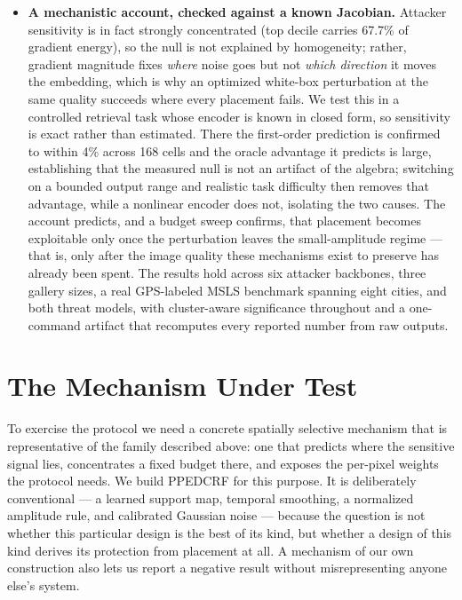 \documentclass[10pt,journal]{IEEEtran}
\begin{document}
\begin{itemize}
	\item \textbf{A mechanistic account, checked against a known Jacobian.} Attacker sensitivity is in fact strongly concentrated (top decile carries 67.7\% of gradient energy), so the null is not explained by homogeneity; rather, gradient magnitude fixes \emph{where} noise goes but not \emph{which direction} it moves the embedding, which is why an optimized white-box perturbation at the same quality succeeds where every placement fails. We test this in a controlled retrieval task whose encoder is known in closed form, so sensitivity is exact rather than estimated. There the first-order prediction is confirmed to within 4\% across 168 cells and the oracle advantage it predicts is large, establishing that the measured null is not an artifact of the algebra; switching on a bounded output range and realistic task difficulty then removes that advantage, while a nonlinear encoder does not, isolating the two causes. The account predicts, and a budget sweep confirms, that placement becomes exploitable only once the perturbation leaves the small-amplitude regime --- that is, only after the image quality these mechanisms exist to preserve has already been spent. The results hold across six attacker backbones, three gallery sizes, a real GPS-labeled MSLS benchmark spanning eight cities, and both threat models, with cluster-aware significance throughout and a one-command artifact that recomputes every reported number from raw outputs.
\end{itemize}

\section{The Mechanism Under Test}
\label{sec:method}

To exercise the protocol we need a concrete spatially selective mechanism that
is representative of the family described above: one that predicts where the
sensitive signal lies, concentrates a fixed budget there, and exposes the
per-pixel weights the protocol needs. We build PPEDCRF for this purpose. It is
deliberately conventional --- a learned support map, temporal smoothing, a
normalized amplitude rule, and calibrated Gaussian noise --- because the
question is not whether this particular design is the best of its kind, but
whether a design of this kind derives its protection from placement at all. A
mechanism of our own construction also lets us report a negative result
without misrepresenting anyone else's system.
\end{document}
